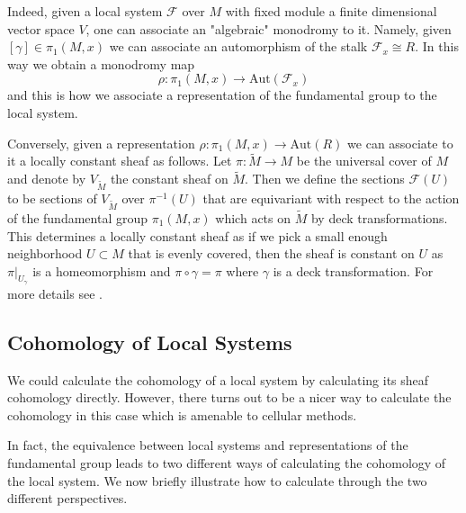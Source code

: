 Indeed, given a local system $\mathcal{F}$ over $M$ with fixed module a finite
dimensional vector space $V$, one can associate an "algebraic" monodromy to it.
Namely, given $[\gamma] \in \pi_1(M,x)$ we can associate an automorphism of the
stalk $\mathcal{F}_x \cong R$. In this way we obtain a monodromy map $$ \rho :
    \pi_1(M, x) \to \text{Aut}(\mathcal{F}_x) $$ and this is how we associate a
representation of the fundamental group to the local system.

Conversely, given a representation $\rho : \pi_1(M, x) \to \text{Aut}(R)$ we
can associate to it a locally constant sheaf as follows. Let $\pi: \tilde{M}
    \to M$ be the universal cover of $M$ and denote by $V_{\tilde{M}}$ the constant
sheaf on $\tilde{M}$. Then we define the sections $\mathcal{F}(U)$ to be
sections of $V_{\tilde{M}}$ over $\pi^{-1}(U)$ that are equivariant with
respect to the action of the fundamental group $\pi_1(M,x)$ which acts on
$\tilde{M}$ by deck transformations. This determines a locally constant sheaf
as if we pick a small enough neighborhood $U \subset M$ that is evenly covered,
then the sheaf is constant on $U$ as $\pi|_{U_{\gamma}}$ is a homeomorphism and
$\pi \circ \gamma = \pi$ where $\gamma$ is a deck transformation. For more
details see \cite{ElZeinSnoussi2009}.

\subsection{Cohomology of Local Systems}
We could calculate the cohomology of a local system by calculating its sheaf
cohomology directly. However, there turns out to be a nicer way to calculate
the cohomology in this case which is amenable to cellular methods.

In fact, the equivalence between local systems and representations of the
fundamental group leads to two different ways of calculating the cohomology of
the local system. We now briefly illustrate how to calculate through the two
different perspectives.

